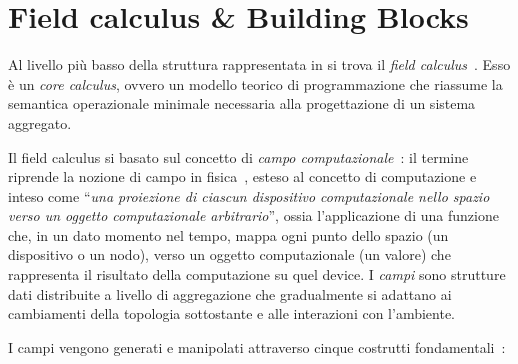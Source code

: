 \section{Field calculus \& Building Blocks}\label{sec:field-calculus}

Al livello più basso della struttura rappresentata in  si trova il \emph{field calculus}~\cite{FieldCalculusFOCLASA2013}.
Esso è un \emph{core calculus}, ovvero un modello teorico di programmazione che riassume la semantica operazionale minimale necessaria alla progettazione di un sistema aggregato.

Il field calculus si basato sul concetto di \emph{campo computazionale}~\cite{FieldCalculusFOCLASA2013}:
il termine riprende la nozione di campo in fisica~\cite{mcmullin2002origins}, esteso al concetto di computazione
e inteso come \enquote{\emph{una proiezione di ciascun dispositivo computazionale nello spazio verso un oggetto computazionale arbitrario}},
ossia l'applicazione di una funzione che, in un dato momento nel tempo, mappa ogni punto dello spazio (un dispositivo o un nodo),
verso un oggetto computazionale (un valore) che rappresenta il risultato della computazione su quel device.
I \emph{campi} sono strutture dati distribuite a livello di aggregazione che gradualmente si adattano ai cambiamenti della topologia sottostante e alle interazioni con l'ambiente.

I campi vengono generati e manipolati attraverso cinque costrutti fondamentali~\cite{BV-FOCAS2014,computationalfields-forte2015}:


